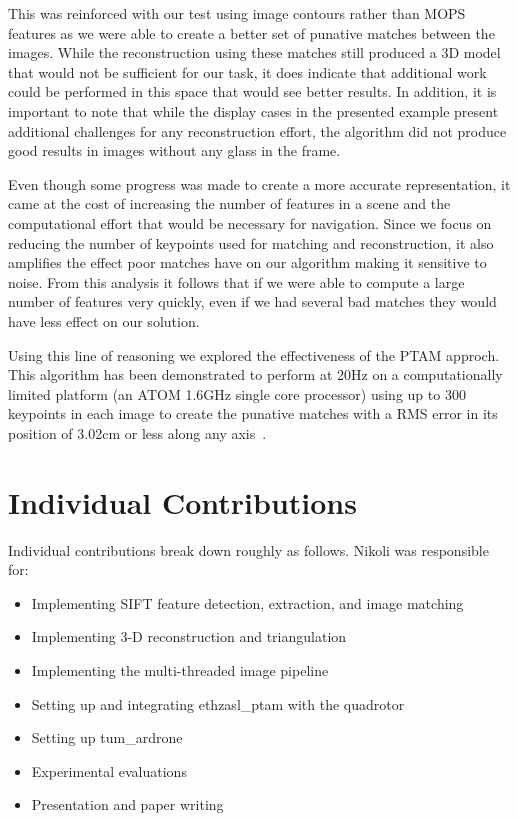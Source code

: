 \documentclass{acmsiggraph}
\begin{document}
This was reinforced with our test using image contours rather than MOPS features as we were able to create a better set of
punative matches between the images.  While the reconstruction using these matches still produced a 3D model that would not
be sufficient for our task, it does indicate that additional work could be performed in this space that would see better
results.  In addition, it is important to note that while the display cases in the presented example present additional
challenges for any reconstruction effort, the algorithm did not produce good results in images without any glass in the 
frame.  

Even though some progress was made to create a more accurate representation, it came at the cost of increasing the
number of features in a scene and the computational effort that would be necessary for navigation.  Since we focus on 
reducing the number of keypoints used for matching and reconstruction, it also amplifies the effect poor matches have on
our algorithm making it sensitive to noise.  From this analysis it follows that if we were able to compute a large number of
features very quickly, even if we had several bad matches they would have less effect on our solution.

Using this line of reasoning we explored the effectiveness of the PTAM approch.  This algorithm has been demonstrated to
perform at 20Hz on a computationally limited platform (an ATOM 1.6GHz single core processor) using up to 300 keypoints in each
image to create the punative matches with a RMS error in its position of 3.02cm or less along any axis~\cite{weiss2011}.


\section{Individual Contributions}
Individual contributions break down roughly as follows. Nikoli was responsible for:
\begin{itemize}
\item Implementing SIFT feature detection, extraction, and image matching
\item Implementing 3-D reconstruction and triangulation
\item Implementing the multi-threaded image pipeline
\item Setting up and integrating ethzasl\_ptam with the quadrotor
\item Setting up tum\_ardrone
\item Experimental evaluations
\item Presentation and paper writing
\end{itemize}
\end{document}
